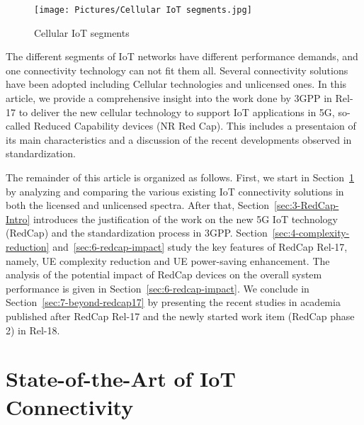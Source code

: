 \documentclass[]{IEEEtran}
\begin{document}
\begin{figure}
\centerline{\texttt{[image: Pictures/Cellular IoT segments.jpg]}}
\caption{Cellular IoT segments~\cite{kuhlins_cellular_2020}}
\label{fig:CIoT_segments}
\end{figure}
{
\justify
The different segments of IoT networks have different performance demands, and one connectivity technology can not fit them all.
}
Several connectivity solutions have been adopted including Cellular technologies and unlicensed ones.
In this article, we provide a comprehensive insight into the work done by 3GPP in Rel-17 to deliver the new cellular technology to support IoT applications in 5G, so-called Reduced Capability devices (NR Red Cap).
This includes a presentaion of its main characteristics and a discussion of the recent developments observed in standardization.

The remainder of this article is organized as follows.
First, we start in Section~\ref{sec:2-IoT-Connectivity} by analyzing and comparing the various existing IoT connectivity solutions in both the licensed and unlicensed spectra.
After that, Section~\ref{sec:3-RedCap-Intro} introduces the justification of the work on the new 5G IoT technology (RedCap) and the standardization process in 3GPP.
Section~\ref{sec:4-complexity-reduction} and~\ref{sec:6-redcap-impact}  study the key features of RedCap Rel-17, namely, UE complexity reduction and UE power-saving enhancement.
The analysis of the potential impact of RedCap devices on the overall system performance is given in Section~\ref{sec:6-redcap-impact}.
We conclude in Section~\ref{sec:7-beyond-redcap17} by presenting the recent studies in academia published after RedCap Rel-17 and the newly started work item (RedCap phase 2) in Rel-18.




\section{State-of-the-Art of IoT Connectivity}
\label{sec:2-IoT-Connectivity}

\end{document}
